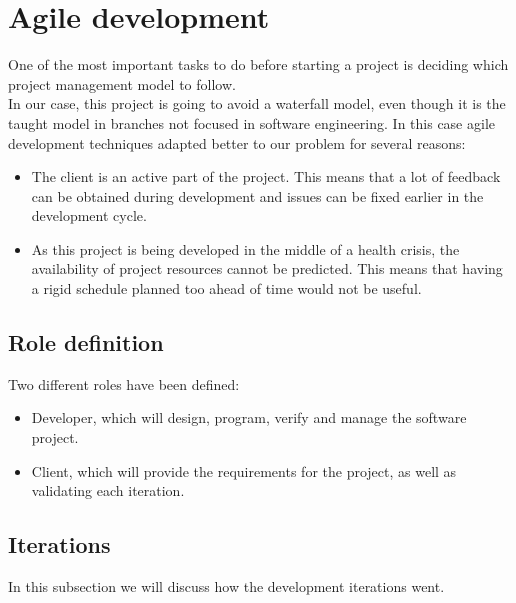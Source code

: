 \section{Agile development}

    One of the most important tasks to do before starting a project is deciding
    which project management model to follow.\\

    In our case, this project is going to avoid a waterfall model, even though it is the taught model in branches  not focused
    in software engineering. In this case  agile development techniques adapted better to
    our problem for several reasons:
    \begin{itemize}
      \item The client is an active part of the project. This means that
      a lot of feedback can be obtained during development and issues can be fixed earlier in the development cycle.
      \item As this project is being developed in the middle of a health crisis,
      the availability of project resources cannot be predicted. This means
      that having a rigid schedule planned too ahead of time would not  be
      useful.
    \end{itemize}

    \subsection{Role definition}

    Two different roles have been defined:
    \begin{itemize}
      \item Developer, which will design, program, verify and manage the
      software project.
      \item Client, which will provide the requirements for the project, as well
      as validating each iteration.
    \end{itemize}

    \subsection{Iterations}

      In this subsection we will discuss how the development iterations went.\\

